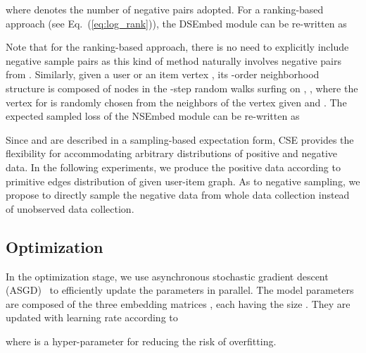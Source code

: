 \documentclass[sigconf,anonymous=false]{acmart}
\begin{document}
where  denotes the number of negative pairs adopted.
For a ranking-based approach (see Eq.~(\ref{eq:log_rank})), the DSEmbed module
can be re-written as

Note that for the ranking-based approach, there is no need to explicitly
include  negative sample pairs as this kind of method naturally involves negative
pairs from .
Similarly, given a user or an item vertex , its -order
neighborhood structure  is composed of nodes in the -step random
walks surfing on , , where the vertex for
 is randomly chosen from the neighbors of the vertex 
given  and .
The expected sampled loss of the NSEmbed module can be re-written as


Since  and  are described in a sampling-based
expectation form, CSE provides the flexibility for accommodating arbitrary
distributions of positive and negative data. In the following experiments, we produce
the positive data according to primitive edges distribution of given user-item graph.
As to negative sampling, we propose to directly sample the negative data from whole
data collection instead of unobserved data collection. 





\subsection{Optimization}

In the optimization stage, we use asynchronous stochastic gradient
descent (ASGD)~\cite{ASGD} to efficiently update the parameters in parallel.
The model parameters are composed of the three embedding matrices , each having the size .
They are updated with learning rate  according to 

where  is a hyper-parameter for reducing the risk of overfitting.
\end{document}
